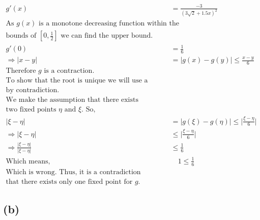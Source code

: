 \documentclass{article}
\begin{document}
\begin{align*}
    g'(x) &= \frac{-3}{(3\sqrt{2}+1.5x)^2}\\
    \text{As $g(x)$ is a monotone decreasing function within the}&\\
    \text{bounds of $\left[0, \frac{1}{2}\right]$ we can find the upper bound.}&\\
    g'(0)&= \frac{1}{6}\\
    \Rightarrow |x-y|&= |g(x)-g(y)| \le \frac{x-y}{6}\\
    \text{Therefore $g$ is a contraction.}&\\
    \text{To show that the root is unique we will use a proof}&\\
    \text{by contradiction.}&\\
    \text{We make the assumption that there exists}&\\
    \text{two fixed points $\eta$ and $\xi$. So,}&\\
    |\xi - \eta|&= |g(\xi)-g(\eta)|\le \bigg | \frac{\xi - \eta}{6}\bigg |\\
    \Rightarrow |\xi - \eta|& \le \bigg | \frac{\xi - \eta}{6}\bigg |\\
    \Rightarrow \frac{| \xi - \eta|}{|\xi - \eta|}& \le \frac{1}{6}\\
    \text{Which means, }&\quad 1 \le \frac{1}{6}\\
    \text{Which is wrong. Thus, it is a contradiction meaning}&\\
    \text{that there exists only one fixed point for $g$.}
\end{align*}

\vspace{10mm}
\subsection*{(b)}
\end{document}
